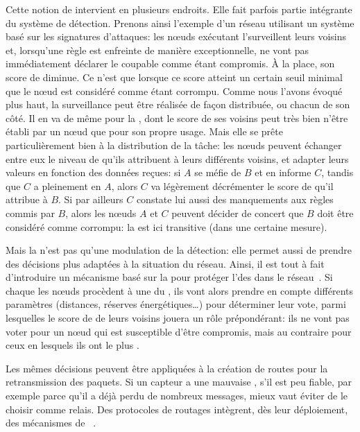 Cette notion de  intervient en plusieurs endroits.
Elle fait parfois partie intégrante du système de détection.
Prenons ainsi l'exemple d'un réseau utilisant un système basé sur les signatures d'attaques: les nœuds exécutant l'\IDS surveillent leurs voisins et, lorsqu'une règle est enfreinte de manière exceptionnelle, ne vont pas immédiatement déclarer le coupable comme étant compromis.
À la place, son score de \reput diminue.
Ce n'est que lorsque ce score atteint un certain seuil minimal que le nœud est considéré comme étant corrompu.
Comme nous l'avons évoqué plus haut, la surveillance peut être réalisée de façon distribuée, ou chacun de son côté.
Il en va de même pour la \reput, dont le score de ses voisins peut très bien n'être établi par un nœud que pour son propre usage.
Mais elle se prête particulièrement bien à la distribution de la tâche: les nœuds peuvent échanger entre eux le niveau de  qu'ils attribuent à leurs différents voisins, et adapter leurs valeurs en fonction des données reçues: si $A$ se méfie de $B$ et en informe $C$, tandis que $C$ a pleinement  en $A$, alors $C$ va légèrement décrémenter le score de \reput qu'il attribue à $B$.
Si par ailleurs $C$ constate lui aussi des manquements aux règles commis par $B$, alors les nœuds $A$ et $C$ peuvent décider de concert que $B$ doit être considéré comme corrompu: la  est ici transitive (dans une certaine mesure).

Mais la  n'est pas qu'une modulation de la détection: elle permet aussi de prendre des décisions plus adaptées à la situation du réseau.
Ainsi, il est tout à fait d'introduire un mécanisme basé sur la  pour protéger l'\election des \chs dans le réseau~\cite{CPG06}.
Si chaque les nœuds procèdent à une \election du \CH, ils vont alors prendre en compte différents paramètres (distances, réserves énergétiques\dots) pour déterminer leur vote, parmi lesquelles le score de \reput de leurs voisins jouera un rôle prépondérant: ils ne vont pas voter pour un nœud qui est susceptible d'être compromis, mais au contraire pour ceux en lesquels ils ont le plus .

Les mêmes décisions peuvent être appliquées à la création de routes pour la retransmission des paquets.
Si un capteur a une mauvaise \reput, \cad s'il est peu fiable, par exemple parce qu'il a déjà perdu de nombreux messages, mieux vaut éviter de le choisir comme relais.
Des protocoles de routages intègrent, dès leur déploiement, des mécanismes de ~\cite{ZTLMK13}.

